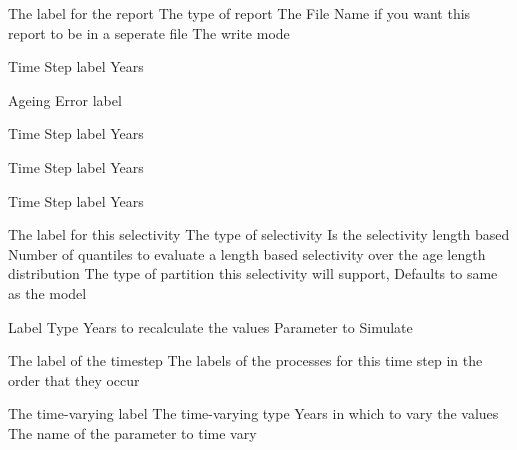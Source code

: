 {The label for the report}
 {The type of report}
 {The File Name if you want this report to be in a seperate file}
 {The write mode}
\par\textbf{}\par
{} {Time Step label}
 {Years}
 {}
 {}
\par\textbf{}\par
{} {Ageing Error label}
\par\textbf{}\par
\par\textbf{}\par
{} {Time Step label}
 {Years}
\par\textbf{}\par
{} {Time Step label}
 {Years}
\par\textbf{}\par
{} {Time Step label}
 {Years}
\par\textbf{}\par
{}\par\par
{} {The label for this selectivity}
 {The type of selectivity}
 {Is the selectivity length based}
 {Number of quantiles to evaluate a length based selectivity over the age length distribution}
 {The type of partition this selectivity will support, Defaults to same as the model}
 {}
 {}
\par\par
{} {Label}
 {Type}
 {Years to recalculate the values}
 {Parameter to Simulate}
\par\par
{} {The label of the timestep}
 {The labels of the processes for this time step in the order that they occur}
\par\par
{} {The time-varying label}
 {The time-varying type}
 {Years in which to vary the values}
 {The name of the parameter to time vary}
